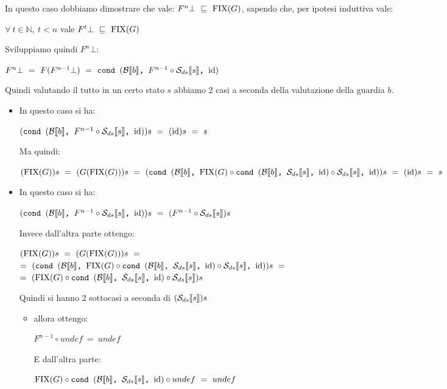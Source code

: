 {	 In questo caso dobbiamo dimostrare che vale:
	$F^{n}\bot~\mineq~\fixp{G}$, sapendo che, per ipotesi induttiva vale:
	\begin{center}
	$\forall~t\in\mathbb{N},~t<n$ vale $F^{t}\bot~\mineq~\fixp{G}$
	\end{center}
	Sviluppiamo quindi $F^{n}\bot$:
	\begin{center}
	$F^{n}\bot~=~F(F^{n-1}\bot)~=~\cond{b}{F^{n-1} \circ \Sds{}}{\idDS}$
	\end{center}
	Quindi valutando il tutto in un certo stato $s$ abbiamo 2 casi a seconda
	della valutazione della guardia $b$.
	\begin{itemize}
		\item {} In questo caso si ha:
		\begin{center}
		$(\cond{b}{F^{n-1} \circ \Sds{}}{\idDS})s~=~(\idDS)s~=~s$
		\end{center}
		Ma quindi:
		\begin{center}
		$(\fixp{G})s~=~(G(\fixp{G}))s~=~(\cond{b}{\fixp{G} \circ 
		\cond{b}{\Sds{}}{\idDS} \circ{} \Sds{}}{\idDS})s~=~(\idDS)s~=~s$
		\end{center}

		\item {} In questo caso si ha:
		\begin{center}
		$(\cond{b}{F^{n-1} \circ \Sds{}}{\idDS})s~=~(F^{n-1} \circ \Sds{})s$
		\end{center}
		Invece dall'altra parte ottengo:
		\begin{center}
		$(\fixp{G})s~=~(G(\fixp{G}))s~=$\\$=~(\cond{b}{\fixp{G} \circ 
		\cond{b}{\Sds{}}{\idDS} \circ{} \Sds{}}{\idDS})s~=$\\$=~
		(\fixp{G} \circ \cond{b}{\Sds{}}{\idDS} \circ{} \Sds{})s$
		\end{center}

		Quindi si hanno 2 sottocasi a seconda di $(\Sds{})s$
		\begin{itemize}
			\item {} allora ottengo:
			\begin{center}
			$F^{n-1} \circ undef~=~undef$
			\end{center}
			E dall'altra parte:
			\begin{center}
			$\fixp{G} \circ \cond{b}{\Sds{}}{\idDS} \circ{} undef~=~undef$
			\end{center}


\end{itemize}
\end{itemize}}
